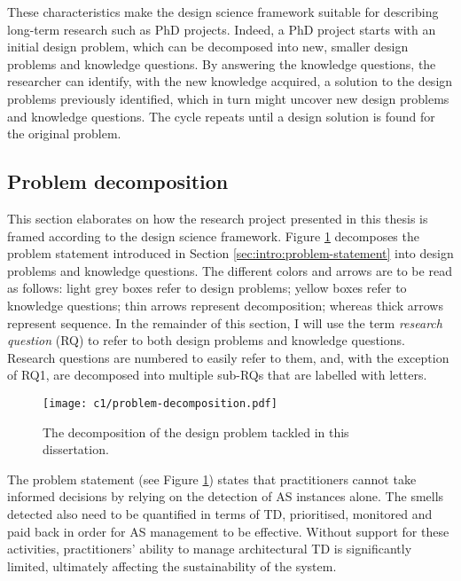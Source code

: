 These characteristics make the design science framework suitable for describing long-term research such as PhD projects.
Indeed, a PhD project starts with an initial design problem, which can be decomposed into new, smaller design problems and knowledge questions.
By answering the knowledge questions, the researcher can identify, with the new knowledge acquired, a solution to the design problems previously identified, which in turn might uncover new design problems and knowledge questions.
The cycle repeats until a design solution is found for the original problem.

\subsection{Problem decomposition}
This section elaborates on how the research project presented in this thesis is framed according to the design science framework. 
Figure \ref{fig:intro:problem-decomposition} decomposes the problem statement introduced in Section \ref{sec:intro:problem-statement} into design problems and knowledge questions.
The different colors and arrows are to be read as follows: light grey boxes refer to design problems; yellow boxes refer to knowledge questions; thin arrows represent decomposition; whereas thick arrows represent sequence.
In the remainder of this section, I will use the term \emph{research question} (RQ) to refer to both design problems and knowledge questions.
Research questions are numbered to easily refer to them, and, with the exception of RQ1, are decomposed into multiple sub-RQs that are labelled with letters.

\begin{figure}
    \centering
    \texttt{[image: c1/problem-decomposition.pdf]}
    \caption{The decomposition of the design problem tackled in this dissertation.}\label{fig:intro:problem-decomposition}
\end{figure}

The problem statement (see Figure \ref{fig:intro:problem-decomposition}) states that practitioners cannot take informed decisions by relying on the detection of AS instances alone.
The smells detected also need to be quantified in terms of TD, prioritised, monitored and paid back in order for AS management to be effective.
Without support for these activities, practitioners' ability to manage architectural TD is significantly limited, ultimately affecting the sustainability of the system.

